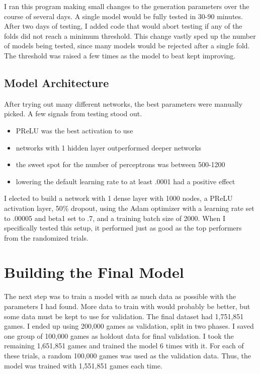 \documentclass[twoside,twocolumn]{article}
\begin{document}
I ran this program making small changes to the generation parameters over the course of several days.  A single model would be fully tested in 30-90 minutes.  After two days of testing, I added code that would abort testing if any of the folds did not reach a minimum threshold.  This change vastly sped up the number of models being tested, since many models would be rejected after a single fold.  The threshold was raised a few times as the model to beat kept improving.  

\subsection {Model Architecture}

After trying out many different networks, the best parameters were manually picked.  A few signals from testing stood out. 

\begin{itemize}
\item PReLU was the best activation to use
\item networks with 1 hidden layer outperformed deeper networks
\item the sweet spot for the number of perceptrons was between 500-1200
\item lowering the default learning rate to at least .0001 had a positive effect
\end{itemize}

I elected to build a network with 1 dense layer with 1000 nodes, a PReLU activation layer,  50\% dropout, using the Adam optimizer with a learning rate set to .00005 and beta1 set to .7, and a training batch size of 2000.  When I specifically tested this setup, it performed just as good as the top performers from the randomized trials.

\section {Building the Final Model}

The next step was to train a model with as much data as possible with the parameters I had found.  More data to train with would probably be better, but some data must be kept to use for validation.  The final dataset had 1,751,851 games.  I ended up using 200,000 games as validation, split in two phases.  I saved one group of 100,000 games as holdout data for final validation.  I took the remaining 1,651,851 games and trained the model 6 times with it.  For each of these trials, a random 100,000 games was used as the validation data.  Thus, the model was trained with 1,551,851 games each time.
\end{document}
